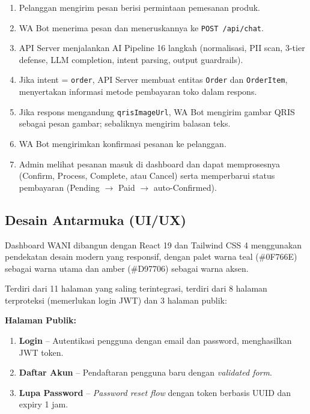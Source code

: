 \documentclass[12pt,a4paper,oneside]{article}
\newcommand{\sub}[1]{%
    \subsection{#1}%
}
\begin{document}
\begin{enumerate}
	\item Pelanggan mengirim pesan berisi permintaan pemesanan produk.
	\item WA Bot menerima pesan dan meneruskannya ke \texttt{POST /api/chat}.
	\item API Server menjalankan AI Pipeline 16 langkah (normalisasi, PII scan, 3-tier defense, LLM completion, intent parsing, output guardrails).
	\item Jika intent = \texttt{order}, API Server membuat entitas \texttt{Order} dan \texttt{OrderItem}, menyertakan informasi metode pembayaran toko dalam respons.
	\item Jika respons mengandung \texttt{qrisImageUrl}, WA Bot mengirim gambar QRIS sebagai pesan gambar; sebaliknya mengirim balasan teks.
	\item WA Bot mengirimkan konfirmasi pesanan ke pelanggan.
	\item Admin melihat pesanan masuk di dashboard dan dapat memprosesnya (Confirm, Process, Complete, atau Cancel) serta memperbarui status pembayaran (Pending $\rightarrow$ Paid $\rightarrow$ auto-Confirmed).
\end{enumerate}

\sub{Desain Antarmuka (UI/UX)}

Dashboard WANI dibangun dengan React 19 dan Tailwind CSS 4 menggunakan pendekatan desain modern yang responsif, dengan palet warna teal (\#0F766E) sebagai warna utama dan amber (\#D97706) sebagai warna aksen.

Terdiri dari 11 halaman yang saling terintegrasi, terdiri dari 8 halaman terproteksi (memerlukan login JWT) dan 3 halaman publik:

\textbf{Halaman Publik:}
\begin{enumerate}
	\item \textbf{Login} -- Autentikasi pengguna dengan email dan password, menghasilkan JWT token.
	\item \textbf{Daftar Akun} -- Pendaftaran pengguna baru dengan \textit{validated form}.
	\item \textbf{Lupa Password} -- \textit{Password reset flow} dengan token berbasis UUID dan expiry 1 jam.
\end{enumerate}
\end{document}
